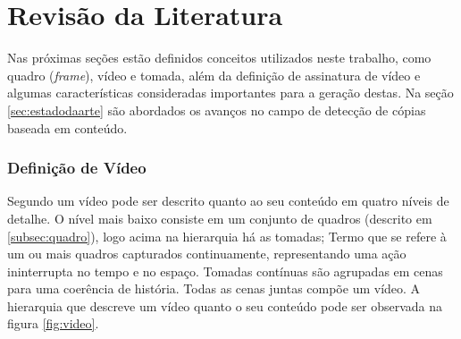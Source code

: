 



\chapter{Revisão da Literatura}
\label{chap:revisao}

	Nas próximas seções estão definidos conceitos utilizados neste trabalho, como quadro (\textit{frame}), vídeo e tomada, além da definição de assinatura de vídeo e algumas características consideradas importantes para a geração destas. Na seção \ref{sec:estadodaarte} são abordados os avanços no campo de detecção de cópias baseada em conteúdo.
    
    \subsection{Definição de Vídeo}
    \label{sec:video}
    
    Segundo \citeauthor{lienhart1997video} um vídeo pode ser descrito quanto ao seu conteúdo em quatro níveis de detalhe. O nível mais baixo consiste em um conjunto de quadros (descrito em \ref{subsec:quadro}), logo acima na hierarquia há as tomadas; Termo que se refere à um ou mais quadros capturados continuamente, representando uma ação ininterrupta no tempo e no espaço. Tomadas contínuas são agrupadas em cenas para uma coerência de história. Todas as cenas juntas compõe um vídeo. A hierarquia que descreve um vídeo quanto o seu conteúdo pode ser observada na figura \ref{fig:video}.

